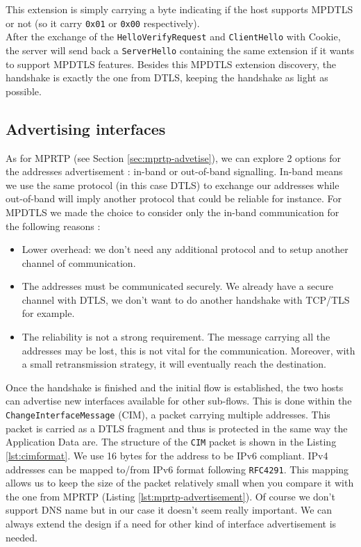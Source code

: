 This extension is simply carrying a byte indicating if the host supports MPDTLS or not (so it carry \texttt{0x01} or \texttt{0x00} respectively).\\

After the exchange of the \texttt{HelloVerifyRequest} and \texttt{ClientHello} with Cookie, the server will send back a \texttt{ServerHello} containing the same extension if it wants to support MPDTLS features. Besides this MPDTLS extension discovery, the handshake is exactly the one from DTLS, keeping the handshake as light as possible.

\subsection{Advertising interfaces}
\label{sec:advertise}

As for MPRTP (see Section \ref{sec:mprtp-advetise}), we can explore 2 options for the addresses advertisement : in-band or out-of-band signalling. In-band means we use the same protocol (in this case DTLS) to exchange our addresses while out-of-band will imply another protocol that could be reliable for instance.  For MPDTLS we made the choice to consider only the in-band communication for the following reasons : 

\begin{itemize}
\item Lower overhead: we don't need any additional protocol and to setup another channel of communication.
\item The addresses must be communicated securely. We already have a secure channel with DTLS, we don't want to do another handshake with TCP/TLS for example.
\item The reliability is not a strong requirement. The message carrying all the addresses may be lost, this is not vital for the communication. Moreover, with a small retransmission strategy, it will eventually reach the destination.
\end{itemize}


Once the handshake is finished and the initial flow is established, the two hosts can advertise new interfaces available for other sub-flows. This is done within the \texttt{ChangeInterfaceMessage} (CIM), a packet carrying multiple addresses. This packet is carried as a DTLS fragment and thus is protected in the same way the Application Data are. The structure of the \texttt{CIM} packet is shown in the Listing \ref{lst:cimformat}. We use 16 bytes for the address to be IPv6 compliant. IPv4 addresses can be mapped to/from IPv6 format following \texttt{RFC4291}\cite{rfc4291}. This mapping allows us to keep the size of the packet relatively small when you compare it with the one from MPRTP (Listing \ref{lst:mprtp-advertisement}). Of course we don't support DNS name but in our case it doesn't seem really important. We can always extend the design if a need for other kind of interface advertisement is needed.

